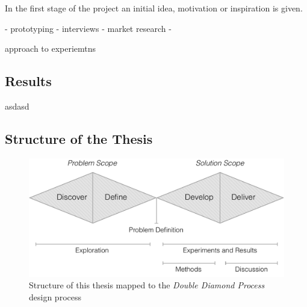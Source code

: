 In the first stage of the project an initial idea, motivation or inspiration is given.

- prototyping
- interviews
- market research
-

approach to experiemtns



\subsection{Results}

asdasd

\subsection{Structure of the Thesis}

\begin{figure}[h]
    \centering
    \includegraphics[width=\textwidth]{img/double-diamond-with-structure}
    \caption{Structure of this thesis mapped to the \emph{Double Diamond Process} design process }
\label{fig:double-diamond-with-structure}
\end{figure}

